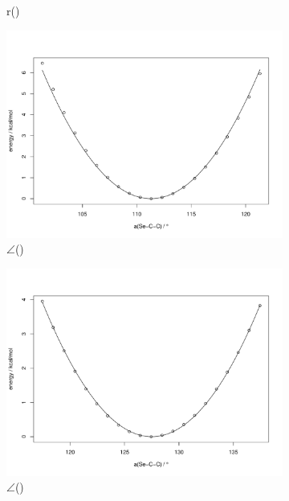 \begin{refsection}
\begin{figure}
\begin{subfigure}{0.4\linewidth}
        \caption{r()}
    \end{subfigure}
    \begin{subfigure}{0.4\linewidth}
        \includegraphics[width=\linewidth]{Figures/ch2-sifig/SeCC1.pdf}
        \caption{$ \angle $()}
    \end{subfigure}
    \begin{subfigure}{0.4\linewidth}
        \includegraphics[width=\linewidth]{Figures/ch2-sifig/SeCC2.pdf}
        \caption{$ \angle $()}
    \end{subfigure}
    \begin{subfigure}{0.4\linewidth}

\end{subfigure}
\end{figure}
\end{refsection}
